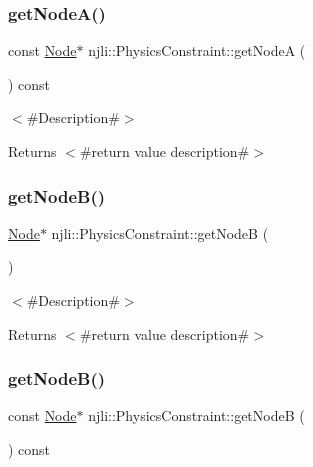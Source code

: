 \subsubsection{\texorpdfstring{get\+Node\+A()}{getNodeA()}\hspace{0.1cm}{\footnotesize\ttfamily [2/2]}}
{\footnotesize\ttfamily const \mbox{\hyperlink{classnjli_1_1_node}{Node}}$\ast$ njli\+::\+Physics\+Constraint\+::get\+NodeA (\begin{DoxyParamCaption}{ }\end{DoxyParamCaption}) const}

$<$\#\+Description\#$>$

\begin{DoxyReturn}{Returns}
$<$\#return value description\#$>$ 
\end{DoxyReturn}
\mbox{\label{classnjli_1_1_physics_constraint_adecbad6334d7fbfdafc8bc5bab75d171}} 
\subsubsection{\texorpdfstring{get\+Node\+B()}{getNodeB()}\hspace{0.1cm}{\footnotesize\ttfamily [1/2]}}
{\footnotesize\ttfamily \mbox{\hyperlink{classnjli_1_1_node}{Node}}$\ast$ njli\+::\+Physics\+Constraint\+::get\+NodeB (\begin{DoxyParamCaption}{ }\end{DoxyParamCaption})}

$<$\#\+Description\#$>$

\begin{DoxyReturn}{Returns}
$<$\#return value description\#$>$ 
\end{DoxyReturn}
\mbox{\label{classnjli_1_1_physics_constraint_aebd01f59387c919d255c07f1b1c0e0a2}} 
\subsubsection{\texorpdfstring{get\+Node\+B()}{getNodeB()}\hspace{0.1cm}{\footnotesize\ttfamily [2/2]}}
{\footnotesize\ttfamily const \mbox{\hyperlink{classnjli_1_1_node}{Node}}$\ast$ njli\+::\+Physics\+Constraint\+::get\+NodeB (\begin{DoxyParamCaption}{ }\end{DoxyParamCaption}) const}

